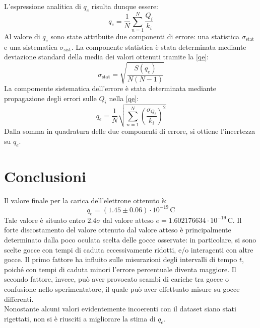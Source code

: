 \documentclass[]{article}
\let\oldsection\section%
\renewcommand{\section}{%
	\renewcommand{\theequation}{\thesection.\arabic{equation}}%
	\oldsection}%
\begin{document}
    L'espressione analitica di $q_e$ risulta dunque essere:
    \begin{equation}
        \label{qe}
        q_e = \frac{1}{N} \sum_{n=1}^{N} \frac{Q_i}{k_i}
    \end{equation}
    Al valore di $q_e$ sono state attribuite due componenti di errore: una statistica $\sigma_{\text{stat}}$ e una sistematica $\sigma_{\text{sist}}$. La componente statistica è stata determinata mediante deviazione standard della media dei valori ottenuti tramite la \ref{qe}:
    \begin{equation}
        \label{sigma-stat}
        \sigma_{\text{stat}} = \sqrt{ \frac{S(q_e)}{N \left(N-1 \right)} }
    \end{equation}
    La compomente sistematica dell'errore è stata determinata mediante propagazione degli errori sulle $Q_i$ nella \ref{qe}:
    \begin{equation}
        q_e = \frac{1}{N} \sqrt{\sum_{n=1}^{N} \left(\frac{\sigma_{Q_i}}{k_i} \right)^2}
    \end{equation}
    Dalla somma in quadratura delle due componenti di errore, si ottiene l'incertezza su $q_e$.

    \section{Conclusioni}
    Il valore finale per la carica dell'elettrone ottenuto è:
    \begin{equation}
        q_e = \left( 1.45 \pm 0.06 \right) \cdot 10^{-19} \, \text{C}
    \end{equation}
    Tale valore è situato entro $2.4\sigma$ dal valore atteso $e = 1.602176634 \cdot 10^{-19} \, \text{C}$. Il forte discostamento del valore ottenuto dal valore atteso è principalmente determinato dalla poco oculata scelta delle gocce osservate: in particolare, si sono scelte gocce con tempi di caduta eccessivamente ridotti, e/o interagenti con altre gocce. Il primo fattore ha influito sulle misurazioni degli intervalli di tempo $t$, poiché con tempi di caduta minori l'errore percentuale diventa maggiore. Il secondo fattore, invece, può aver provocato scambi di cariche tra gocce o confusione nello sperimentatore, il quale può aver effettuato misure su gocce differenti. \\
    Nonostante alcuni valori evidentemente incoerenti con il dataset siano stati rigettati, non si è riusciti a migliorare la stima di $q_e$.
    
\end{document}
